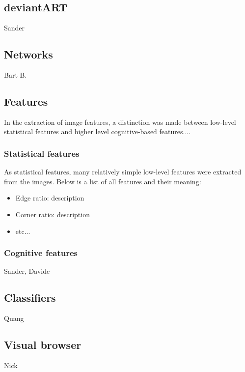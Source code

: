 \subsection{deviantART}
Sander

\subsection{Networks}
Bart B.

\subsection{Features}
In the extraction of image features, a distinction was made between low-level statistical features and higher level cognitive-based features....

\subsubsection{Statistical features}
As statistical features, many relatively simple low-level features were extracted from the images. Below is a list of all features and their meaning:
\begin{itemize}
\item Edge ratio: description
\item Corner ratio: description
\item etc...
\end{itemize}
\subsubsection{Cognitive features}
Sander, Davide

\subsection{Classifiers}
Quang

\subsection{Visual browser}
Nick